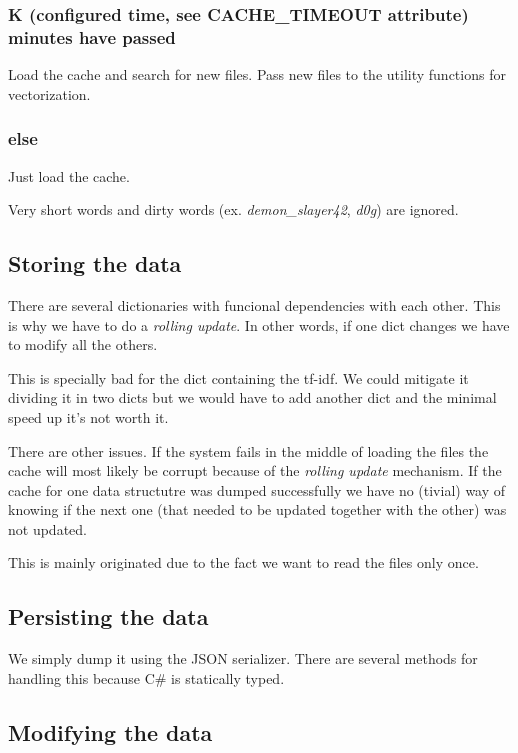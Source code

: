 \documentclass{report}
\begin{document}
\subsubsection{K (configured time, see \textbf{CACHE\_TIMEOUT} attribute) minutes have passed}

Load the cache and search for new files. Pass new files to the utility functions for vectorization.

\subsubsection{else}

Just load the cache.

Very short words and dirty words (ex. \emph{demon\_slayer42}, \emph{d0g}) are ignored.

\subsection{Storing the data}

There are several dictionaries with funcional dependencies with each other. This is why we have to do a \emph{rolling update}. In other words, if one dict changes we have to modify all the others.

This is specially bad for the dict containing the tf-idf. We could mitigate it dividing it in two dicts but we would have to add another dict and the minimal speed up it's not worth it.

There are other issues. If the system fails in the middle of loading the files the cache will most likely be corrupt because of the \emph{rolling update} mechanism. If the cache for one data structutre was dumped successfully we have no (tivial) way of knowing if the next one (that needed to be updated together with the other) was not updated.

This is mainly originated due to the fact we want to read the files only once.

\subsection{Persisting the data}

We simply dump it using the JSON serializer. There are several methods for handling this because C\# is statically typed.

\subsection{Modifying the data}
\end{document}
